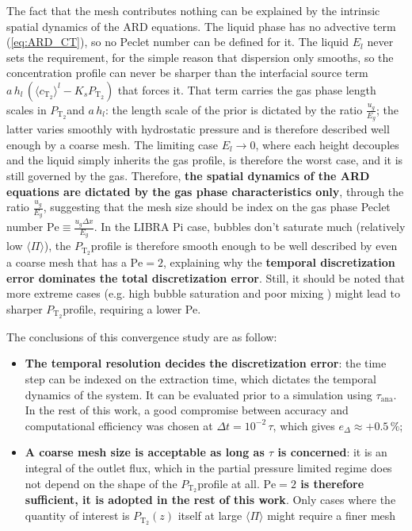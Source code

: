 \documentclass[a4paper,11pt,oneside]{report}
\newcommand{\PT}{\ensuremath{P_\mathrm{T_2}}}
\newcommand{\CT}{\ensuremath{c_\mathrm{T_2}}}
\newcommand{\Tana}{\ensuremath{\tau_\mathrm{ana}}}
\newcommand{\PI}{\ensuremath{\langle \Pi \rangle}}
\begin{document}
The fact that the mesh contributes nothing can be explained by the intrinsic spatial dynamics of the ARD equations. The liquid phase has no advective term (\cref{eq:ARD_CT}), so no Peclet number can be defined for it. The liquid $E_l$ never sets the requirement, for the simple reason that dispersion only smooths, so the concentration profile can never be sharper than the interfacial source term $a\,h_l\,(\langle\CT\rangle^l-K_s\PT)$ that forces it. That term carries the gas phase length scales in \PT and $a\,h_l$: the length scale of the prior is dictated by the ratio $\frac{u_g}{E_g}$; the latter varies smoothly with hydrostatic pressure and is therefore described well enough by a coarse mesh. The limiting case $E_l\rightarrow0$, where each height decouples and the liquid simply inherits the gas profile, is therefore the worst case, and it is still governed by the gas. Therefore, \textbf{the spatial dynamics of the ARD equations are dictated by the gas phase characteristics only}, through the ratio $\frac{u_g}{E_g}$, suggesting that the mesh size should be index on the gas phase Peclet number $\mathrm{Pe}\equiv\frac{u_g\Delta x}{E_g}$. In the LIBRA Pi case, bubbles don't saturate much (relatively low \PI), the \PT profile is therefore smooth enough to be well described by even a coarse mesh that has a $\mathrm{Pe=2}$, explaining why the \textbf{temporal discretization error dominates the total discretization error}. Still, it should be noted that more extreme cases (e.g. high bubble saturation and poor mixing ) might lead to sharper \PT profile, requiring a lower Pe.


The conclusions of this convergence study are as follow:
\begin{itemize}
    \item \textbf{The temporal resolution decides the discretization error}: the time step can be indexed on the extraction time, which dictates the temporal dynamics of the system. It can be evaluated prior to a simulation using \Tana. In the rest of this work, a good compromise between accuracy and computational efficiency was chosen at $\Delta t = 10^{-2}\,\tau$, which gives $e_\Delta\approx+0.5\,\%$;
    \item \textbf{A coarse mesh size is acceptable as long as $\tau$ is concerned}: it is an integral of the outlet flux, which in the partial pressure limited regime does not depend on the shape of the \PT profile at all. \textbf{$\mathrm{Pe}=2$ is therefore sufficient, it is adopted in the rest of this work}. Only cases where the quantity of interest is $\PT(z)$ itself at large $\langle\Pi\rangle$ might require a finer mesh
\end{itemize}
\end{document}
